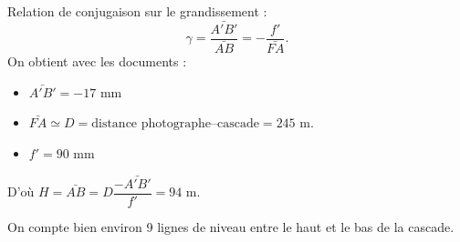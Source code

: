 \begin{solution}
    Relation de conjugaison sur le grandissement :
    $$\gamma = \dfrac{\bar{A'B'}}{\bar{AB}} = -\frac{f'}{\bar{FA}}.$$
    On obtient avec les documents :
    \begin{itemize}
        \item $\bar{A'B'} = -17$ mm
        \item $\bar{FA} \simeq D = \text{distance photographe--cascade} = 245$ m.
        \item $f' = 90$ mm
    \end{itemize}
    D'où $H = \bar{AB} = D\dfrac{-\bar{A'B'}}{f'} = 94$ m.

    On compte bien environ 9 lignes de niveau entre le haut et le bas de la cascade.
\end{solution}